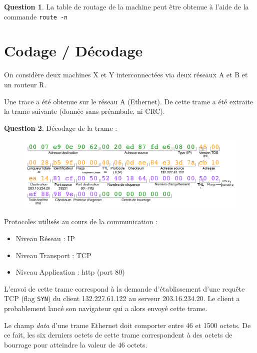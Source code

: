 \documentclass[11pt,english,french]{scrreprt}
\theoremstyle{remark}
\theoremstyle{definition}
\newtheorem{ques}{Question}[section]
\begin{document}
\begin{ques}
	La table de routage de la machine peut être obtenue à l'aide de la commande \lstinline!route -n!
\end{ques}

\section{Codage / Décodage} %

On considère deux machines X et Y interconnectées via deux réseaux A et B et un routeur R.

Une trace a été obtenue sur le réseau A (Ethernet). De cette trame a été extraite la trame suivante (donnée sans préambule, ni CRC).

\begin{ques}
	Décodage de la trame :
	\begin{figure}[h]
		\center
		\includegraphics[scale=.7]{Exam2009/trame3}
	\end{figure}
	
	Protocoles utilisés au cours de la communication :\begin{itemize}
		\item Niveau Réseau : IP
		\item Niveau Transport : TCP 
		\item Niveau Application : http (port 80)
	\end{itemize}
	
	L'envoi de cette trame correspond à la demande d'établissement d'une requête TCP (flag \lstinline!SYN!) du client 132.227.61.122 au serveur 203.16.234.20. Le client a probablement lancé son navigateur qui a alors envoyé cette trame.
	
	Le champ \emph{data} d'une trame Ethernet doit comporter entre 46 et 1500 octets. De ce fait, les six derniers octets de cette trame correspondent à des octets de bourrage pour atteindre la valeur de 46 octets.
\end{ques}
\end{document}
